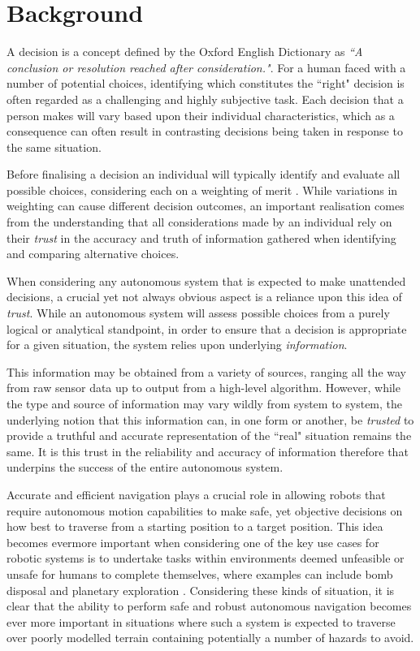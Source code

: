 \section{Background}

A decision is a concept defined by the Oxford English Dictionary \cite{oxford-dictionary} as \textit{``A conclusion or resolution reached after consideration."}. For a human faced with a number of potential choices, identifying which constitutes the ``right" decision is often regarded as a challenging and highly subjective task. Each decision that a person makes will vary based upon their individual characteristics, which as a consequence can often result in contrasting decisions being taken in response to the same situation. 

Before finalising a decision an individual will typically identify and evaluate all possible choices, considering each on a weighting of merit \cite{rational-decision-model}. While variations in weighting can cause different decision outcomes, an important realisation comes from the understanding that all considerations made by an individual rely on their \textit{trust} in the accuracy and truth of information gathered when identifying and comparing alternative choices.

 When considering any autonomous system that is expected to make unattended decisions, a crucial yet not always obvious aspect is a reliance upon this idea of \textit{trust}. While an autonomous system will assess possible choices from a purely logical or analytical standpoint, in order to ensure that a decision is appropriate for a given situation, the system relies upon underlying \textit{information}.
 
 This information may be obtained from a variety of sources, ranging all the way from raw sensor data up to output from a high-level algorithm. However, while the type and source of information may vary wildly from system to system, the underlying notion that this information can, in one form or another, be \textit{trusted} to provide a truthful and accurate representation of the ``real" situation remains the same. It is this trust in the reliability and accuracy of information therefore that underpins the success of the entire autonomous system.
 
  Accurate and efficient navigation plays a crucial role in allowing robots that require autonomous motion capabilities to make safe, yet objective decisions on how best to traverse from a starting position to a target position. This idea becomes evermore important when considering one of the key use cases for robotic systems is to undertake tasks within environments deemed unfeasible or unsafe for humans to complete themselves, where examples can include bomb disposal \cite{bomb-disposal} and planetary exploration \cite{planet-explore}. Considering these kinds of situation, it is clear that the ability to perform safe and robust autonomous navigation becomes ever more important in situations where such a system is expected to traverse over poorly modelled terrain containing potentially a number of hazards to avoid. 

